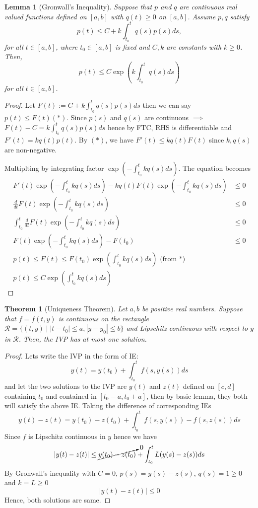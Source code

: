 \documentclass[12pt,reqno]{amsart}
\theoremstyle{plain}
\newtheorem{thm}{Theorem}
\newtheorem{lem}{Lemma}
\theoremstyle{definition}
\newcommand{\cal}[1]{\mathcal{#1}}
\begin{document}
\begin{lem}[Gronwall's Inequality]
    Suppose that $p$ and $q$ are continuous real valued functions defined on $[a,b]$ with $q(t) \geq 0$ on $[a,b]$. Assume $p,q$ satisfy
    $$ p(t) \leq C + k\int_{t_0}^{t} q(s)p(s)ds,$$
    for all $t \in [a,b]$, where $t_0 \in [a,b]$ is fixed and $C,k$ are constants with $k \geq 0$. Then,
    $$ p(t) \leq C\exp\left(k\int_{t_0}^{t}q(s) ds\right)$$
    for all $t \in [a,b]$.
\end{lem}
\begin{proof}
    Let $F(t) := C + k\int_{t_0}^{t} q(s)p(s) ds$ then we can say $p(t) \leq F(t)(*)$. Since $p(s)$ and $q(s)$ are continuous $\implies$ $F(t) - C = k\int_{t_0}^{t}q(s)p(s)ds$ hence by FTC, RHS is differentiable and $F'(t) = kq(t)p(t)$. By $(*)$, we have $F'(t) \leq kq(t)F(t)$ since $k,q(s)$ are non-negative.
    
    Multiplting by integrating factor $\exp\left(-\int_{t_0}^{t} kq(s)ds\right)$. The equation becomes 
    \begin{align*}
        F'(t)\exp\left(-\int_{t_0}^{t} kq(s)ds\right) - kq(t)F(t)\exp\left(-\int_{t_0}^{t} kq(s)ds\right) &\leq 0 \\
        \frac{d}{dt}F(t)\exp\left(-\int_{t_0}^{t} kq(s)ds\right) &\leq 0 \\
        \int_{t_0}^{t}\frac{d}{dt}F(t)\exp\left(-\int_{t_0}^{t} kq(s)ds\right) &\leq 0 \\
        F(t)\exp\left(-\int_{t_0}^{t} kq(s)ds\right) - F(t_0) &\leq 0 \\
        p(t) \leq F(t) \leq F(t_0)\exp\left(\int_{t_0}^{t} kq(s)ds\right) \text{ (from *)} \\
        p(t) \leq C\exp\left(\int_{t_0}^{t} kq(s)ds\right)
    \end{align*}
\end{proof}

\begin{thm}[Uniqueness Theorem]
    Let $a,b$ be positive real numbers. Suppose that $f = f(t,y)$ is continuous on the rectangle $\cal R = \{(t,y) \mid |t-t_0| \leq a, |y-y_0| \leq b\}$ and Lipschitz continuous with respect to $y$ in $\cal R$. Then, the IVP has at most one solution.
\end{thm}
\begin{proof}
    Lets write the IVP in the form of IE:
    $$ y(t) = y(t_0) + \int_{t_0}^{t} f(s, y(s)) ds$$ and let the two solutions to the IVP are $y(t)$ and $z(t)$ defined on $[c,d]$ containing $t_0$ and contained in $[t_0 - a, t_0 + a]$, then by basic lemma, they both will satisfy the above IE. Taking the difference of corresponding IEs
    $$ y(t) - z(t) = y(t_0) - z(t_0) + \int_{t_0}^{t} f(s, y(s)) - f(s, z(s)) ds$$
    Since $f$ is Lipschitz continuous in $y$ hence we have
    $$  |y(t) - z(t)| \leq \cancelto{0}{y(t_0) - z(t_0)} + \int_{t_0}^{t} L (y(s) - z(s)) ds $$
    By Gronwall's inequality with $C = 0$, $p(s) = y(s) - z(s)$, $q(s) = 1 \geq 0$ and $k=L \geq 0$
    $$ |y(t) - z(t)| \leq 0$$
    Hence, both solutions are same.
\end{proof}
\end{document}
